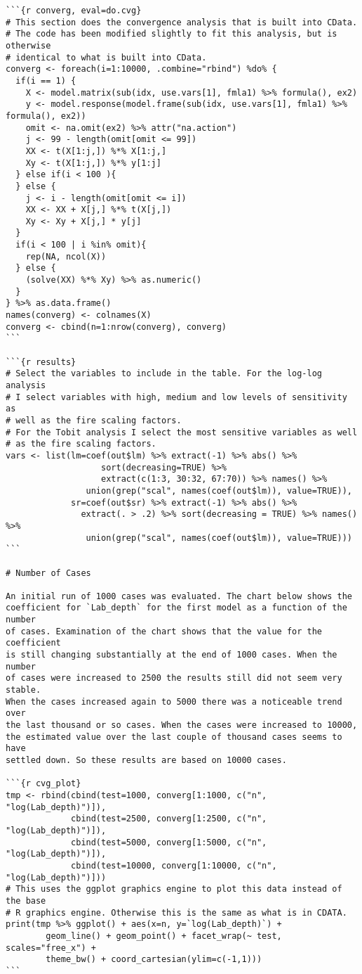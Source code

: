 \begin{lstlisting}[basicstyle=\scriptsize]
```{r converg, eval=do.cvg}
# This section does the convergence analysis that is built into CData.
# The code has been modified slightly to fit this analysis, but is otherwise
# identical to what is built into CData.
converg <- foreach(i=1:10000, .combine="rbind") %do% {
  if(i == 1) {
    X <- model.matrix(sub(idx, use.vars[1], fmla1) %>% formula(), ex2)
    y <- model.response(model.frame(sub(idx, use.vars[1], fmla1) %>% formula(), ex2))
    omit <- na.omit(ex2) %>% attr("na.action")
    j <- 99 - length(omit[omit <= 99])
    XX <- t(X[1:j,]) %*% X[1:j,]
    Xy <- t(X[1:j,]) %*% y[1:j]
  } else if(i < 100 ){
  } else {
    j <- i - length(omit[omit <= i])
    XX <- XX + X[j,] %*% t(X[j,])
    Xy <- Xy + X[j,] * y[j]
  }
  if(i < 100 | i %in% omit){
    rep(NA, ncol(X))
  } else {
    (solve(XX) %*% Xy) %>% as.numeric()
  }
} %>% as.data.frame()
names(converg) <- colnames(X)
converg <- cbind(n=1:nrow(converg), converg)
```

```{r results}
# Select the variables to include in the table. For the log-log analysis
# I select variables with high, medium and low levels of sensitivity as
# well as the fire scaling factors.
# For the Tobit analysis I select the most sensitive variables as well
# as the fire scaling factors.
vars <- list(lm=coef(out$lm) %>% extract(-1) %>% abs() %>%
                   sort(decreasing=TRUE) %>%
                   extract(c(1:3, 30:32, 67:70)) %>% names() %>%
                union(grep("scal", names(coef(out$lm)), value=TRUE)),
             sr=coef(out$sr) %>% extract(-1) %>% abs() %>%
               extract(. > .2) %>% sort(decreasing = TRUE) %>% names() %>%
                union(grep("scal", names(coef(out$lm)), value=TRUE)))
```

# Number of Cases

An initial run of 1000 cases was evaluated. The chart below shows the
coefficient for `Lab_depth` for the first model as a function of the number
of cases. Examination of the chart shows that the value for the coefficient
is still changing substantially at the end of 1000 cases. When the number
of cases were increased to 2500 the results still did not seem very stable.
When the cases increased again to 5000 there was a noticeable trend over
the last thousand or so cases. When the cases were increased to 10000,
the estimated value over the last couple of thousand cases seems to have
settled down. So these results are based on 10000 cases.

```{r cvg_plot}
tmp <- rbind(cbind(test=1000, converg[1:1000, c("n", "log(Lab_depth)")]),
             cbind(test=2500, converg[1:2500, c("n", "log(Lab_depth)")]),
             cbind(test=5000, converg[1:5000, c("n", "log(Lab_depth)")]),
             cbind(test=10000, converg[1:10000, c("n", "log(Lab_depth)")]))
# This uses the ggplot graphics engine to plot this data instead of the base
# R graphics engine. Otherwise this is the same as what is in CDATA.
print(tmp %>% ggplot() + aes(x=n, y=`log(Lab_depth)`) +
        geom_line() + geom_point() + facet_wrap(~ test, scales="free_x") +
        theme_bw() + coord_cartesian(ylim=c(-1,1)))
```


\end{lstlisting}
